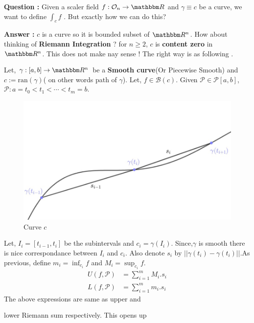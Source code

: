 \documentclass[Analysis-3]{subfiles}
\begin{document}
\textbf{Question :} Given a scaler field $f : \mathcal{O}_n \to \R$ and $\gamma \equiv c$ be a curve, we want to define $\int_c f$ . But exactly how we can do this?

\textbf{Answer :} $c$ is a curve so it is bounded subset of $\R^n$. How about thinking of \textbf{Riemann Integration} ? for $n \ge 2$, $c$ is \textbf{content zero} in $\R^n$. This does not make nay sense ! The right way is as following .

\vspace*{0.5cm}

Let, $\gamma :[a,b]\to \R^n$ be a \textbf{Smooth curve}(Or Piecewise Smooth) and $c:= \text{ran}(\gamma)$( on other words path of $\gamma$). Let, $f \in \mathscr{B}(c)$. Given $\mathcal{P} \in \mathscr{P}[a,b]$, $\mathcal{P} : a = t_0<t_1<\cdots <t_m = b$.

\vspace{0.2cm}

\begin{figure}
    \centering
    \includegraphics[width=.98\linewidth]{figures/lec-23.1.png}
    \caption{Curve $c$}
\end{figure}
Let, $I_i = [t_{i-1},t_i]$ be the subintervals and $c_i = \gamma(I_i)$.
Since,$\gamma$ is smooth there is nice correspondance between $I_i$ and $c_i$. Also denote $s_i$ by $||\gamma(t_i) - \gamma(t_i)||$.As previous, define $m_i = \inf_{c_i}f$ and $M_i = \sup_{c_i}f$.
\begin{align*}
    U(f,\mathcal{P}) & = \sum_{i=1}^{m}M_i.s_i \\
    L(f,\mathcal{P}) & = \sum_{i=1}^{m}m_i.s_i
\end{align*}
The above expressions are same as upper and \vspace{0.05cm}

lower Riemann sum respectively. This opens up
\end{document}
